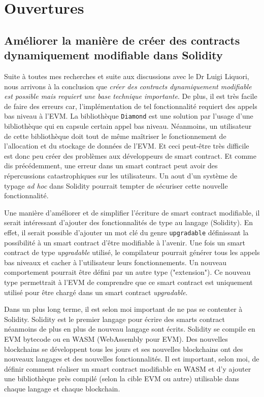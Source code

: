 \section{Ouvertures}

\subsection{Améliorer la manière de créer des contracts dynamiquement modifiable dans Solidity}
Suite à toutes mes recherches et suite aux discussions avec le Dr Luigi Liquori, nous arrivons à la conclusion
que \emph{créer des contracts dynamiquement modifiable est possible mais requiert une base technique importante}.
De plus, il est très facile de faire des erreurs car, l'implémentation de tel fonctionnalité requiert des appels
bas niveau à l'EVM. La bibliothèque \texttt{Diamond} est une solution par l'usage d'une bibliothèque qui en capsule certain
appel bas niveau. Néanmoins, un utilisateur de cette bibliothèque doit tout de même maîtriser le fonctionnement 
de l'allocation et du stockage de données de l'EVM. Et ceci peut-être très difficile est donc peu créer des 
problèmes aux développeurs de smart contract. Et comme dis précédemment, une erreur dans un smart contract
peut avoir des répercussions catastrophiques sur les utilisateurs. Un aout d'un système de typage \emph{ad hoc} dans Solidity pourrait tempter de sécuriser cette nouvelle fonctionnalité.

Une manière d'améliorer et de simplifier  l'écriture de smart contract modifiable, il serait intéressant
d'ajouter des fonctionnalités de type au langage (Solidity). En effet, il serait possible d'ajouter un mot clé du genre \texttt{upgradable} définissant la possibilité à un smart contract d'être modifiable à l'avenir. Une fois un smart contract de type \emph{upgradable} utilisé, le compilateur pourrait générer
tous les appels bas niveaux et cacher à l'utilisateur leurs fonctionnements. Un nouveau comportement pourrait être
défini par un autre type ("extension"). Ce nouveau type permettrait à l'EVM de comprendre que ce smart contract est uniquement utilisé pour être chargé dans un smart contract \emph{upgradable}. 

Dans un plus long terme, il est selon moi important de ne pas se contenter à Solidity. Solidity est le premier langage
pour écrire des smarts contract néanmoins de plus en plus de nouveau langage sont écrits. Solidity se compile en EVM
bytecode ou en WASM (WebAssembly pour EVM). Des nouvelles blockchains se développent tous les jours et ses nouvelles
blockchains ont des nouveaux langages et des nouvelles fonctionnalités. Il est important, selon moi, de définir comment
réaliser un smart contract modifiable en WASM et d'y ajouter une bibliothèque près compilé (selon la cible EVM ou autre)
utilisable dans chaque langage et chaque blockchain.

